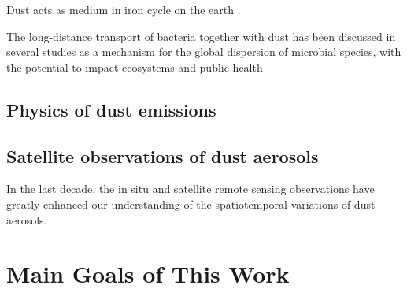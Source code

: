  Dust acts as medium in iron cycle on the earth \citep{jickells05}. 

  The long-distance transport of bacteria together with dust 
  has been discussed in several studies as a mechanism for 
  the global dispersion of microbial species, 
  with the potential to impact ecosystems and public health
  \citep{griffin01,burrows09}

\subsection{Physics of dust emissions}

\subsection{Satellite observations of dust aerosols}

 In the last decade, the in situ and satellite remote sensing observations 
 have greatly enhanced our understanding of the spatiotemporal variations
 of dust aerosols. 

\section{Main Goals of This Work}

